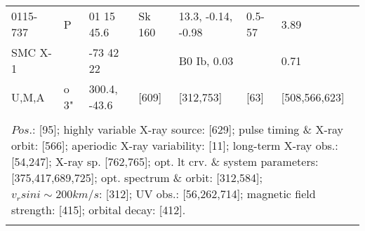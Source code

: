 \documentclass{aa}
\begin{document}
\begin{table*}[h]
\begin{tabular}{p{2.5cm}p{1cm}p{1.8cm}p{2.3cm}p{3.3cm}p{2.0cm}p{2.2cm}}
\noalign{\smallskip}
\hline
\noalign{\smallskip}
0115-737     &    P     & 01 15 45.6           & Sk 160         & 13.3, -0.14, -0.98       &    0.5-57        &  3.89                   \\
SMC X-1      &           & -73 42 22             &                       & B0 Ib, 0.03                 &                       &  0.71                   \\
U,M,A          &  o 3"  & 300.4, -43.6         &     [609]         &    [312,753]                &        [63]         &  [508,566,623]  \\
\\
\multicolumn{7}{p{17.5cm}}{
$Pos$.: [95]; highly variable X-ray source: [629]; pulse timing \& X-ray orbit: [566]; aperiodic X-ray variability: [11];
long-term X-ray obs.: [54,247]; X-ray sp. [762,765]; opt. lt crv. \& system parameters: [375,417,689,725]; opt. 
spectrum \& orbit: [312,584]; $v_rsin i \sim 200 km/s$: [312]; UV obs.: [56,262,714]; magnetic field strength: [415]; 
orbital decay: [412].}\\

\noalign{\smallskip}
\hline
\end{tabular}
\end{table*}
\end{document}
